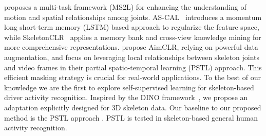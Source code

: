 \textcite{lin2020ms2l} proposes a multi-task framework (MS2L) for enhancing the understanding of motion and spatial relationships among joints. AS-CAL~\cite{rao_augmented_2021} introduces a momentum long short-term memory (LSTM) based approach to regularize the feature space, while SkeletonCLR~\cite{li20213d} applies a memory bank and cross-view knowledge mining for more comprehensive representations. \textcite{guo2022contrastive} propose AimCLR, relying on powerful data augmentation, and \textcite{zhou2023self} focus on leveraging local relationships between skeleton joints and video frames in their partial spatio-temporal learning (PSTL) approach. This efficient masking strategy is crucial for real-world applications. To the best of our knowledge we are the first to explore self-supervised learning for skeleton-based driver activity recognition. Inspired by the DINO framework~\cite{caron2021emerging}, we propose an adaptation explicitly designed for 3D skeleton data. Our baseline to our proposed method is the PSTL approach \cite{zhou2023self}. PSTL is tested in skeleton-based general human activity recognition.

